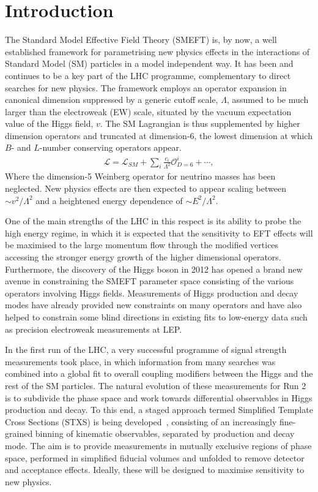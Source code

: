 \documentclass[11pt]{cernrep}
\begin{document}
\section{Introduction}
\label{sec:intro}
The Standard Model Effective Field Theory (SMEFT) is, by now, a well established framework for parametrising new physics effects in the interactions of Standard Model (SM) particles in a model independent way. It has been and continues to be a key part of the LHC programme, complementary to direct searches for new physics. The framework employs an operator expansion in canonical dimension suppressed by a generic cutoff scale, $\Lambda$, assumed to be much larger than the electroweak (EW) scale, situated by the vacuum expectation value of the Higgs field, $v$. The SM Lagrangian is thus supplemented by higher dimension operators and truncated at dimension-6, the lowest dimension at which $B$- and $L$-number conserving operators appear.
\begin{align}
    \mathcal{L}=\mathcal{L}_{SM}+\sum_i \frac{c_i}{\Lambda^2}\mathcal{O}^i_{D=6}+\cdots,
\end{align} 
Where the dimension-5 Weinberg operator for neutrino masses has been neglected. New physics effects are then expected to appear scaling between $\sim v^2/\Lambda^2$ and a heightened energy dependence of $\sim E^2/\Lambda^2$.

One of the main strengths of the LHC in this respect is its ability to probe the high energy regime, in which it is expected that the sensitivity to EFT effects will be maximised to the large momentum flow through the modified  vertices accessing the stronger energy growth of the higher dimensional operators. Furthermore, the discovery of the Higgs boson in 2012 has opened a brand new avenue in constraining the SMEFT parameter space consisting of the various operators involving Higgs fields. Measurements of Higgs production and decay modes have already provided new constraints on many operators and have also helped to constrain some blind directions in existing fits to low-energy data such as precision electroweak measurements at LEP. 

In the first run of the LHC, a very successful programme of signal strength measurements took place, in which information from many searches was combined into a global fit to overall coupling modifiers between the Higgs and the rest of the SM particles. The natural evolution of these measurements for Run 2 is to subdivide the phase space and work towards differential observables in Higgs production and decay. To this end, a staged approach termed Simplified Template Cross Sections (STXS) is being developed~\cite{deFlorian:2016spz}, consisting of an increasingly fine-grained binning of kinematic observables, separated by production and decay mode. The aim is to provide measurements in mutually exclusive regions of phase space, performed in simplified fiducial volumes and unfolded to remove detector and acceptance effects. Ideally, these will be designed to maximise sensitivity to new physics.
\end{document}
